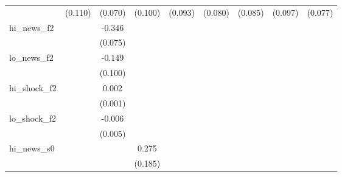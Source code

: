 {\begin{tabular}{l*{8}{c}}
            &     (0.110)         &     (0.070)         &     (0.100)         &     (0.093)         &     (0.080)         &     (0.085)         &     (0.097)         &     (0.077)         \\
\addlinespace
hi\_news\_f2  &                     &      -0.346\sym{***}&                     &                     &                     &                     &                     &                     \\
            &                     &     (0.075)         &                     &                     &                     &                     &                     &                     \\
\addlinespace
lo\_news\_f2  &                     &      -0.149         &                     &                     &                     &                     &                     &                     \\
            &                     &     (0.100)         &                     &                     &                     &                     &                     &                     \\
\addlinespace
hi\_shock\_f2 &                     &       0.002         &                     &                     &                     &                     &                     &                     \\
            &                     &     (0.001)         &                     &                     &                     &                     &                     &                     \\
\addlinespace
lo\_shock\_f2 &                     &      -0.006         &                     &                     &                     &                     &                     &                     \\
            &                     &     (0.005)         &                     &                     &                     &                     &                     &                     \\
\addlinespace
hi\_news\_s0  &                     &                     &       0.275         &                     &                     &                     &                     &                     \\
            &                     &                     &     (0.185)         &                     &                     &                     &                     &                     \\

\end{tabular}}
